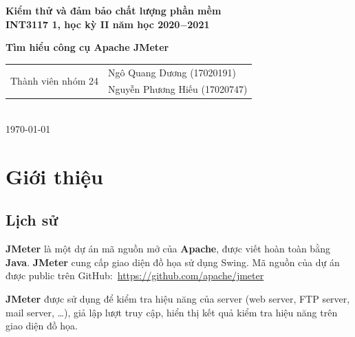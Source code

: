 \documentclass[12pt]{report}
\newcommand{\jmeter}{\textbf{JMeter}}
\newcommand{\apache}{\textbf{Apache}}
\newcommand{\java}{\textbf{Java}}
\begin{document}
\begin{titlepage}

    \begin{center}
        \vfill
        {\LARGE\bf Kiểm thử và đảm bảo chất lượng phần mềm} \\
        {\Large\bf INT3117 1, học kỳ II năm học 2020$-$2021} \\
        \bigskip
        \bigskip

        \bigskip
        {\Huge\bf Tìm hiểu công cụ Apache JMeter}
        \bigskip

        \bigskip
        \bigskip

        \begin{tabular}{c|l}
            \multirow{2}{*}{Thành viên nhóm 24} & Ngô Quang Dương (17020191)    \\
                                                & Nguyễn Phương Hiếu (17020747) \\
        \end{tabular} \\
        \medskip
        {\today}
        \vfill
    \end{center}
\end{titlepage}

\tableofcontents

\chapter{Giới thiệu}

\section{Lịch sử}

\par \jmeter{} là một dự án mã nguồn mở của \apache{}, được viết hoàn toàn bằng \java{}. \jmeter{} cung cấp giao diện đồ họa sử dụng Swing. Mã nguồn của dự án được public trên GitHub:~\url{https://github.com/apache/jmeter}

\par \jmeter{} được sử dụng để kiểm tra hiệu năng của server (web server, FTP server, mail server, \ldots), giả lập lượt truy cập, hiển thị kết quả kiểm tra hiệu năng trên giao diện đồ họa.
\end{document}
